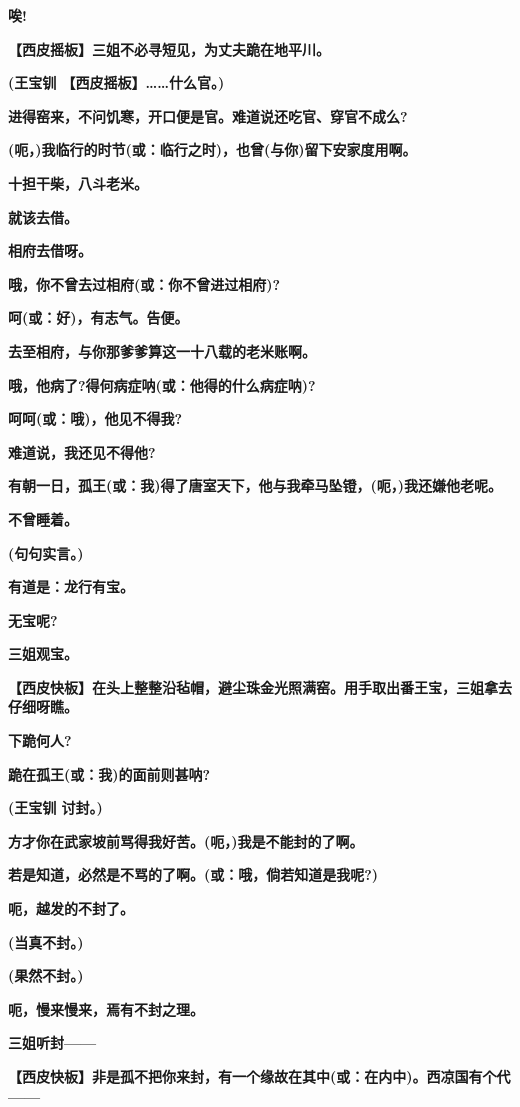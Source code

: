 \textbf{唉!}

\textbf{【西皮摇板】三姐不必寻短见，为丈夫跪在地平川。}

\textbf{(王宝钏 【西皮摇板】\ldots{}\ldots{}什么官。)}

\textbf{进得窑来，不问饥寒，开口便是官。难道说还吃官、穿官不成么?}

\textbf{(呃，)我临行的时节(或：临行之时)，也曾(与你)留下安家度用啊。}

\textbf{十担干柴，八斗老米。}

\textbf{就该去借。}

\textbf{相府去借呀。}

\textbf{哦，你不曾去过相府(或：你不曾进过相府)?}

\textbf{呵(或：好)，有志气。告便。}

\textbf{去至相府，与你那爹爹算这一十八载的老米账啊。}

\textbf{哦，他病了?得何病症呐(或：他得的什么病症呐)?}

\textbf{呵呵(或：哦)，他见不得我?}

\textbf{难道说，我还见不得他?}

\textbf{有朝一日，孤王(或：我)得了唐室天下，他与我牵马坠镫，(呃，)我还嫌他老呢。}

\textbf{不曾睡着。}

\textbf{(句句实言。)}

\textbf{有道是：龙行有宝。}

\textbf{无宝呢?}

\textbf{三姐观宝。}

\textbf{【西皮快板】在头上整整沿毡帽，避尘珠金光照满窑。用手取出番王宝，三姐拿去仔细呀瞧。}

\textbf{下跪何人?}

\textbf{跪在孤王(或：我)的面前则甚呐?}

\textbf{(王宝钏 讨封。)}

\textbf{方才你在武家坡前骂得我好苦。(呃，)我是不能封的了啊。}

\textbf{若是知道，必然是不骂的了啊。(或：哦，倘若知道是我呢?)}

\textbf{呃，越发的不封了。}

\textbf{(当真不封。)}

\textbf{(果然不封。)}

\textbf{呃，慢来慢来，焉有不封之理。}

\textbf{三姐听封------}

\textbf{【西皮快板】非是孤不把你来封，有一个缘故在其中(或：在内中)。西凉国有个代------}

